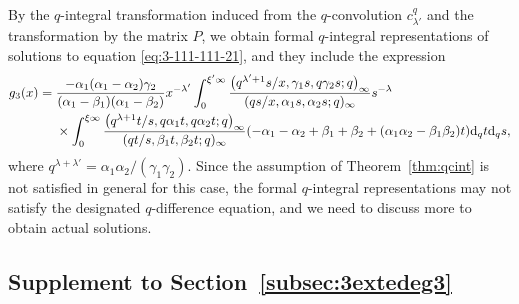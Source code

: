 \documentclass[pdftex]{sigma}
\numberwithin{equation}{section}
\theoremstyle{definition}
\begin{document}
By the $q$-integral transformation induced from the $q$-convolution $c_{\lambda'}^q$ and the transformation by the matrix $P$, we obtain formal $q$-integral representations of solutions to equation \eqref{eq:3-111-111-21}, and they include the expression
\begin{align*}
g_3(x) ={}& \frac{-\alpha_1 (\alpha_1 - \alpha_2) \gamma_2}{(\alpha_1 - \beta_1)(\alpha_1 - \beta_2)} x^{-\lambda'} \int_0^{\xi' \infty} \frac{\bigl(q^{\lambda' + 1}s/x, \gamma_1 s, q\gamma_2 s; q\bigr)_{\infty}}{(qs/x, \alpha_1 s, \alpha_2 s; q)_{\infty}} s^{-\lambda} \\
&\times \int_0^{\xi \infty} \frac{\bigl(q^{\lambda + 1}t/s, q\alpha_1 t, q\alpha_2 t; q\bigr)_{\infty}}{(qt/s, \beta_1 t, \beta_2 t; q)_{\infty}} (-\alpha_1-\alpha_2 + \beta_1 + \beta_2 + (\alpha_1\alpha_2 - \beta_1\beta_2)t) {\rm d}_q t {\rm d}_q s
,
\end{align*}
where $q^{\lambda + \lambda'} = \alpha_1\alpha_2/(\gamma_1\gamma_2)$.
Since the assumption of Theorem~\ref{thm:qcint} is not satisfied in general for this case, the formal $q$-integral representations may not satisfy the designated $q$-difference equation, and we need to discuss more to obtain actual solutions.

\subsection[Supplement to Section 4.6.2]{Supplement to Section~\ref{subsec:3extedeg3}}
\end{document}
